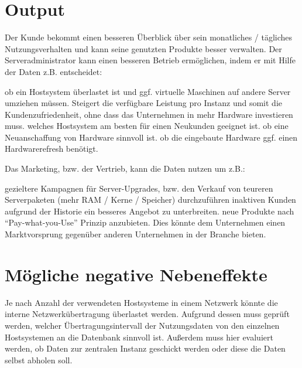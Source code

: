 \section{Output}

Der Kunde bekommt einen besseren Überblick über sein monatliches / tägliches
Nutzungsverhalten und kann seine genutzten Produkte besser verwalten. Der
Serveradministrator kann einen besseren Betrieb ermöglichen, indem er mit Hilfe
der Daten z.B. entscheidet:
\begin{outline}
    \1 ob ein Hostsystem überlastet ist und ggf. virtuelle Maschinen auf andere
       Server umziehen müssen. Steigert die verfügbare Leistung pro Instanz und
       somit die Kundenzufriedenheit, ohne dass das Unternehmen in mehr Hardware
       investieren muss.
    \1 welches Hostsystem am besten für einen Neukunden geeignet ist.
    \1 ob eine Neuanschaffung von Hardware sinnvoll ist.
    \1 ob die eingebaute Hardware ggf. einen Hardwarerefresh benötigt.
\end{outline}

Das Marketing, bzw. der Vertrieb, kann die Daten nutzen um z.B.:
\begin{outline}
    \1 gezieltere Kampagnen für Server-Upgrades, bzw. den Verkauf von teureren
       Serverpaketen (mehr RAM / Kerne / Speicher) durchzuführen
    \1 inaktiven Kunden aufgrund der Historie ein besseres Angebot zu
       unterbreiten.
    \1 neue Produkte nach “Pay-what-you-Use” Prinzip anzubieten. Dies könnte dem
       Unternehmen einen Marktvorsprung gegenüber anderen Unternehmen in der
       Branche bieten.
\end{outline}

\section{Mögliche negative Nebeneffekte}

Je nach Anzahl der verwendeten Hostsysteme in einem Netzwerk könnte die interne
Netzwerkübertragung überlastet werden. Aufgrund dessen muss geprüft werden,
welcher Übertragungsintervall der Nutzungsdaten von den einzelnen Hostsystemen
an die Datenbank sinnvoll ist. Außerdem muss hier evaluiert werden, ob Daten
zur zentralen Instanz geschickt werden oder diese die Daten selbst abholen
soll.

